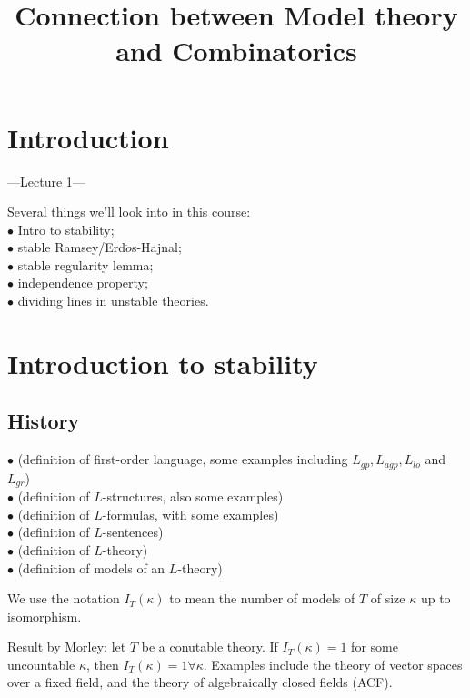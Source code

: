\documentclass[a4paper]{article}
\begin{document}
\title{Connection between Model theory and Combinatorics}

\maketitle

\newpage

\tableofcontents

\newpage

\section{Introduction}
---Lecture 1---

Several things we'll look into in this course:\\
$\bullet$ Intro to stability;\\
$\bullet$ stable Ramsey/Erd$\ddot{o}$s-Hajnal;\\
$\bullet$ stable regularity lemma;\\
$\bullet$ independence property;\\
$\bullet$ dividing lines in unstable theories.

\newpage

\section{Introduction to stability}

\subsection{History}

$\bullet$ (definition of first-order language, some examples including $L_{gp},L_{agp},L_{lo}$ and $L_{gr}$)\\
$\bullet$ (definition of $L$-structures, also some examples)\\
$\bullet$ (definition of $L$-formulas, with some examples)\\
$\bullet$ (definition of $L$-sentences)\\
$\bullet$ (definition of $L$-theory)\\
$\bullet$ (definition of models of an $L$-theory)

We use the notation $I_T(\kappa)$ to mean the number of models of $T$ of size $\kappa$ up to isomorphism.

Result by Morley: let $T$ be a conutable theory. If $I_T(\kappa) = 1$ for some uncountable $\kappa$, then $I_T(\kappa) = 1 \forall \kappa$. Examples include the theory of vector spaces over a fixed field, and the theory of algebraically closed fields (ACF).
\end{document}
